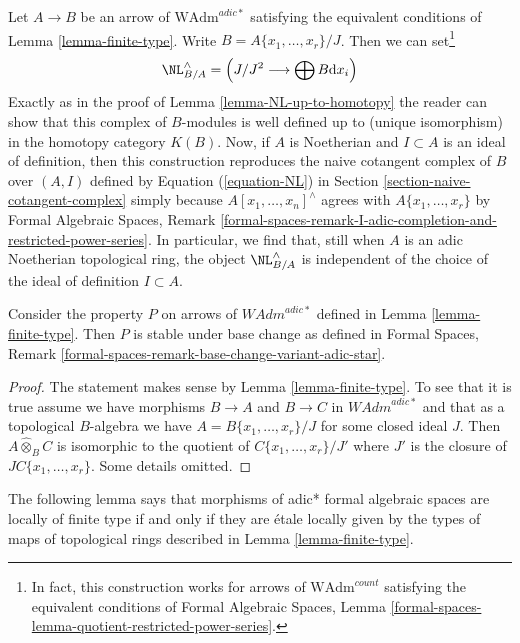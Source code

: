 \begin{remark}
\label{remark-NL-well-defined-topological}
Let $A \to B$ be an arrow of $\text{WAdm}^{adic*}$ satisfying the equivalent
conditions of Lemma \ref{lemma-finite-type}. Write
$B = A\{x_1, \ldots, x_r\}/J$. Then we can set\footnote{In fact, this
construction works for arrows of $\text{WAdm}^{count}$ satisfying the
equivalent conditions of Formal Algebraic Spaces, Lemma
\ref{formal-spaces-lemma-quotient-restricted-power-series}.}
$$
\NL_{B/A}^\wedge = \left(J/J^2 \longrightarrow \bigoplus B\text{d}x_i\right)
$$
Exactly as in the proof of Lemma \ref{lemma-NL-up-to-homotopy}
the reader can show that this complex of $B$-modules is
well defined up to (unique isomorphism) in the homotopy category $K(B)$.
Now, if $A$ is Noetherian and $I \subset A$ is an ideal of definition,
then this construction reproduces the naive cotangent complex
of $B$ over $(A, I)$ defined by Equation (\ref{equation-NL})
in Section \ref{section-naive-cotangent-complex} simply because
$A[x_1, \ldots, x_n]^\wedge$ agrees with $A\{x_1, \ldots, x_r\}$ by
Formal Algebraic Spaces, Remark
\ref{formal-spaces-remark-I-adic-completion-and-restricted-power-series}.
In particular, we find that, still when $A$ is an adic Noetherian
topological ring, the object $\NL_{B/A}^\wedge$ is independent
of the choice of the ideal of definition $I \subset A$.
\end{remark}

\begin{lemma}
\label{lemma-base-change-finite-type}
Consider the property $P$ on arrows of $\textit{WAdm}^{adic*}$ defined in
Lemma \ref{lemma-finite-type}. Then $P$ is stable under base change as
defined in Formal Spaces, Remark
\ref{formal-spaces-remark-base-change-variant-adic-star}.
\end{lemma}

\begin{proof}
The statement makes sense by Lemma \ref{lemma-finite-type}.
To see that it is true assume we have morphisms
$B \to A$ and $B \to C$ in $\textit{WAdm}^{adic*}$
and that as a topological $B$-algebra we have
$A = B\{x_1, \ldots, x_r\}/J$ for some closed ideal $J$.
Then $A \widehat{\otimes}_B C$ is isomorphic to the
quotient of $C\{x_1, \ldots, x_r\}/J'$ where
$J'$ is the closure of $JC\{x_1, \ldots, x_r\}$.
Some details omitted.
\end{proof}

\noindent
The following lemma says that morphisms of adic* formal algebraic spaces
are locally of finite type if and only if they are \'etale locally given
by the types of maps of topological rings described in
Lemma \ref{lemma-finite-type}.

